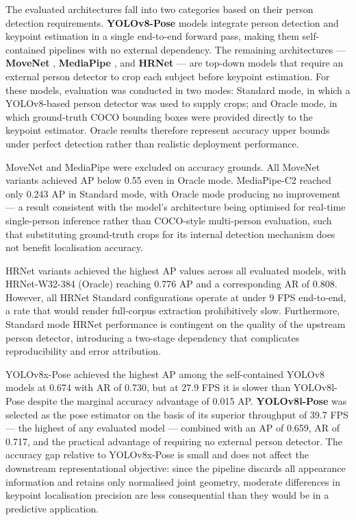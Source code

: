 The evaluated architectures fall into two categories based on their person 
detection requirements. \textbf{YOLOv8-Pose} models integrate person 
detection and keypoint estimation in a single end-to-end forward pass, 
making them self-contained pipelines with no external dependency. The 
remaining architectures --- \textbf{MoveNet} 
\cite{Bazarevsky_2020_MoveNet}, \textbf{MediaPipe} 
\cite{Lugaresi_2019_MediaPipe}, and \textbf{HRNet} 
\cite{Wang_2020_HRNet} --- are top-down models that require an external 
person detector to crop each subject before keypoint estimation. For these 
models, evaluation was conducted in two modes: Standard mode, in which a 
YOLOv8-based person detector was used to supply crops; and Oracle mode, in 
which ground-truth COCO bounding boxes were provided directly to the 
keypoint estimator. Oracle results therefore represent accuracy upper bounds 
under perfect detection rather than realistic deployment performance.

MoveNet and MediaPipe were excluded on accuracy grounds. All MoveNet 
variants achieved AP below 0.55 even in Oracle mode. MediaPipe-C2 reached 
only 0.243 AP in Standard mode, with Oracle mode producing no improvement 
--- a result consistent with the model's architecture being optimised for 
real-time single-person inference rather than COCO-style multi-person 
evaluation, such that substituting ground-truth crops for its internal 
detection mechanism does not benefit localisation accuracy.

HRNet variants achieved the highest AP values across all evaluated models, 
with HRNet-W32-384 (Oracle) reaching 0.776 AP and a corresponding AR of 
0.808. However, all HRNet Standard configurations operate at under 9 FPS 
end-to-end, a rate that would render full-corpus extraction prohibitively 
slow. Furthermore, Standard mode HRNet performance is contingent on the 
quality of the upstream person detector, introducing a two-stage dependency 
that complicates reproducibility and error attribution.

YOLOv8x-Pose achieved the highest AP among the self-contained YOLOv8 
models at 0.674 with AR of 0.730, but at 27.9 FPS it is slower than 
YOLOv8l-Pose despite the marginal accuracy advantage of 0.015 AP. 
\textbf{YOLOv8l-Pose} was selected as the pose estimator on the basis of 
its superior throughput of 39.7 FPS --- the highest of any evaluated model 
--- combined with an AP of 0.659, AR of 0.717, and the practical advantage 
of requiring no external person detector. The accuracy gap relative to 
YOLOv8x-Pose is small and does not affect the downstream representational 
objective: since the pipeline discards all appearance information and 
retains only normalised joint geometry, moderate differences in keypoint 
localisation precision are less consequential than they would be in a 
predictive application.

